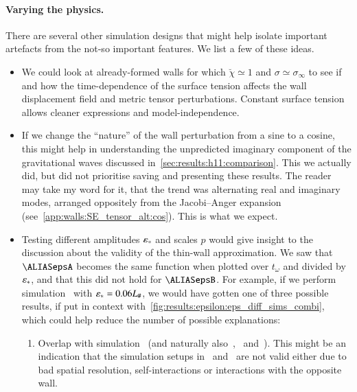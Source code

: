 \paragraph{Varying the physics.} %
There are several other simulation designs that might help isolate important artefacts from the not-so important features. We list a few of these ideas.
\begin{itemize}
    \item We could look at already-formed walls for which $\breve{\chi}\simeq 1$ and  $\sigma \simeq \sigma_\infty$ to see if and how the time-dependence of the surface tension affects the wall displacement field and metric tensor perturbations. Constant surface tension allows cleaner expressions and model-independence. 
    \item If we change the ``nature'' of the wall perturbation from a sine to a cosine, this might help in understanding the unpredicted imaginary component of the gravitational waves discussed in~\cref{sec:results:h11:comparison}. This we actually did, but did not prioritise saving and presenting these results. The reader may take my word for it, that the trend was alternating real and imaginary modes, arranged oppositely from the Jacobi--Anger expansion (see~\cref{app:walls:SE_tensor_alt:cos}). This is what we expect. %
    \item Testing different amplitudes $\varepsilon_\ast$ and scales $p$ would give insight to the discussion about the validity of the thin-wall approximation. We saw that $\epsA$ becomes the same function when plotted over $t_\omega$ and divided by $\varepsilon_\ast$, and that this did not hold for $\epsB$. For example, if we perform simulation~ with $\varepsilon_\ast=0.06L_\#$, we would have gotten one of three possible results, if put in context with~\cref{fig:results:epsilon:eps_diff_sims_combi}, which could help reduce the number of possible explanations: %
    \begin{enumerate}
        \item Overlap with simulation~ (and naturally also~,~ and~). This might be an indication that the simulation setups in~ and~ are not valid either due to bad spatial resolution, self-interactions or interactions with the opposite wall.

\end{enumerate}
\end{itemize}
